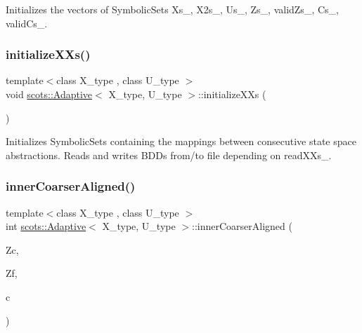 Initializes the vectors of Symbolic\+Sets Xs\+\_\+, X2s\+\_\+, Us\+\_\+, Zs\+\_\+, valid\+Zs\+\_\+, Cs\+\_\+, valid\+Cs\+\_\+. \mbox{\label{classscots_1_1Adaptive_af08ee7fae4cf6c5ae1fcabb8699e0721}} 
\subsubsection{\texorpdfstring{initialize\+X\+Xs()}{initializeXXs()}}
{\footnotesize\ttfamily template$<$class X\+\_\+type , class U\+\_\+type $>$ \\
void \hyperlink{classscots_1_1Adaptive}{scots\+::\+Adaptive}$<$ X\+\_\+type, U\+\_\+type $>$\+::initialize\+X\+Xs (\begin{DoxyParamCaption}{ }\end{DoxyParamCaption})\hspace{0.3cm}{\ttfamily [inline]}}

Initializes Symbolic\+Sets containing the mappings between consecutive state space abstractions. Reads and writes B\+D\+Ds from/to file depending on read\+X\+Xs\+\_\+. \mbox{\label{classscots_1_1Adaptive_a01f8f69d290f9c81f76f6ab44d9ef193}} 
\subsubsection{\texorpdfstring{inner\+Coarser\+Aligned()}{innerCoarserAligned()}}
{\footnotesize\ttfamily template$<$class X\+\_\+type , class U\+\_\+type $>$ \\
int \hyperlink{classscots_1_1Adaptive}{scots\+::\+Adaptive}$<$ X\+\_\+type, U\+\_\+type $>$\+::inner\+Coarser\+Aligned (\begin{DoxyParamCaption}\item[{Symbolic\+Set $\ast$}]{Zc,  }\item[{Symbolic\+Set $\ast$}]{Zf,  }\item[{int}]{c }\end{DoxyParamCaption})\hspace{0.3cm}{\ttfamily [inline]}}

